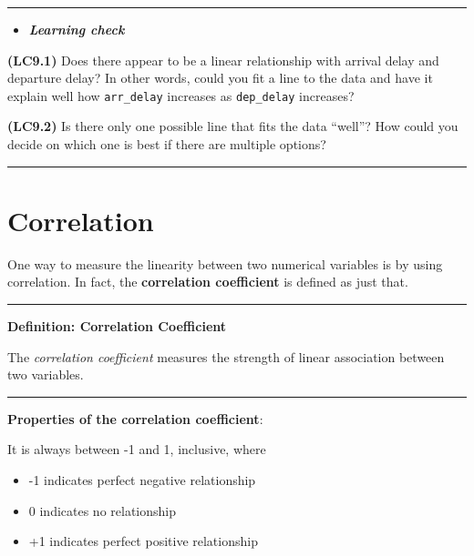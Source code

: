 \documentclass[]{tufte-book}
\let\oldrule=\rule
\renewcommand{\rule}[1]{\oldrule{\linewidth}}
\providecommand{\tightlist}{%
  \setlength{\itemsep}{0pt}\setlength{\parskip}{0pt}}
\newenvironment{rmdblock}[1]
  {\begin{shaded*}
  \begin{itemize}
  \renewcommand{\labelitemi}{
    \raisebox{-.7\height}[0pt][0pt]{
    }
  }
  \item
  }
  {
  \end{itemize}
  \end{shaded*}
  }
\newenvironment{learncheck}
  {\begin{rmdblock}{warning}}
  {\end{rmdblock}}
\begin{document}
\begin{center}\rule{0.5\linewidth}{\linethickness}\end{center}

\begin{learncheck}
\textbf{\emph{Learning check}}
\end{learncheck}

\textbf{(LC9.1)} Does there appear to be a linear relationship with
arrival delay and departure delay? In other words, could you fit a line
to the data and have it explain well how \texttt{arr\_delay} increases
as \texttt{dep\_delay} increases?

\textbf{(LC9.2)} Is there only one possible line that fits the data
``well''? How could you decide on which one is best if there are
multiple options?

\begin{center}\rule{0.5\linewidth}{\linethickness}\end{center}

\section{Correlation}\label{correlation}

One way to measure the linearity between two numerical variables is by
using correlation. In fact, the \textbf{correlation coefficient} is
defined as just that.

\begin{center}\rule{0.5\linewidth}{\linethickness}\end{center}

\textbf{Definition: Correlation Coefficient}

The \emph{correlation coefficient} measures the strength of linear
association between two variables.

\begin{center}\rule{0.5\linewidth}{\linethickness}\end{center}

\textbf{Properties of the correlation coefficient}:

It is always between -1 and 1, inclusive, where

\begin{itemize}
\tightlist
\item
  -1 indicates perfect negative relationship
\item
  0 indicates no relationship
\item
  +1 indicates perfect positive relationship
\end{itemize}
\end{document}
